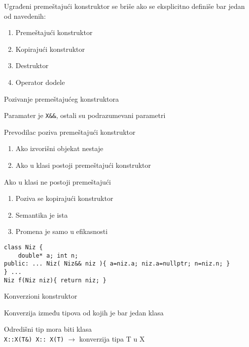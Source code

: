 \documentclass{article}
\newenvironment{xitemize}{%
    
    \itemize
    \larger
}{%
    \enditemize
}
\let\olditemize\itemize
\let\endolditemize\enditemize
\renewenvironment{itemize}{%
    \smaller
    \olditemize
}{%
    \endolditemize
}
\providecommand{\inlinecode}[1]{\texttt{#1}}
\begin{document}
\begin{xitemize}
\begin{itemize}
    \item Ugrađeni premeštajući konstruktor se briše ako se eksplicitno definiše bar jedan od navedenih: 
    \begin{enumerate}
        \item Premeštajući konstruktor
        \item Kopirajući konstruktor
        \item Destruktor
        \item Operator dodele
    \end{enumerate}
    
\end{itemize}

\item Pozivanje premeštajućeg konstruktora
\begin{itemize}
    \item Paramater je \inlinecode{X\&\&}, ostali su podrazumevani parametri 
    \item Prevodilac poziva premeštajući konstruktor
    \begin{enumerate}
        \item Ako izvorišni objekat nestaje
        \item Ako u klasi postoji premeštajući konstruktor
    \end{enumerate}
    \item Ako u klasi ne postoji premeštajući
    \begin{enumerate}
        \item Poziva se kopirajući konstruktor
        \item Semantika je ista
        \item Promena je samo u efikasnosti
    \end{enumerate}
    \begin{lstlisting}
class Niz {
    double* a; int n;
public: ... Niz( Niz&& niz ){ a=niz.a; niz.a=nullptr; n=niz.n; }
} ...
Niz f(Niz niz){ return niz; }
    \end{lstlisting}
\end{itemize}
\item Konverzioni konstruktor
\begin{itemize}
    \item Konverzija između tipova od kojih je bar jedan klasa
    \item Odredišni tip mora biti klasa\\
    \inlinecode{X::X(T\&) X:: X(T)} $\rightarrow$ konverzija tipa T u X

\end{itemize}
\end{xitemize}
\end{document}
